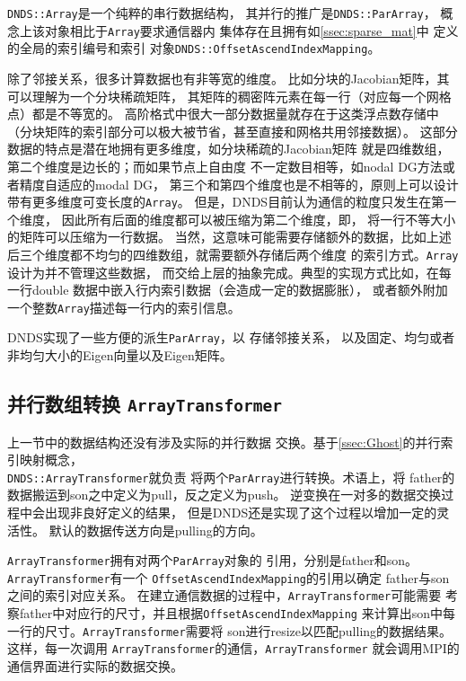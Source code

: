 \documentclass[UTF8,zihao=5]{ctexart} %
\begin{document}
\verb|DNDS::Array|是一个纯粹的串行数据结构，
其并行的推广是\verb|DNDS::ParArray|，
概念上该对象相比于\verb|Array|要求通信器内
集体存在且拥有如\ref{ssec:sparse_mat}中
定义的全局的索引编号和索引
对象\verb|DNDS::OffsetAscendIndexMapping|。


除了邻接关系，很多计算数据也有非等宽的维度。
比如分块的Jacobian矩阵，其可以理解为一个分块稀疏矩阵，
其矩阵的稠密阵元素在每一行（对应每一个网格点）都是不等宽的。
高阶格式中很大一部分数据量就存在于这类浮点数存储中
（分块矩阵的索引部分可以极大被节省，甚至直接和网格共用邻接数据）。
这部分数据的特点是潜在地拥有更多维度，如分块稀疏的Jacobian矩阵
就是四维数组，第二个维度是边长的；而如果节点上自由度
不一定数目相等，如nodal DG方法或者精度自适应的modal DG，
第三个和第四个维度也是不相等的，原则上可以设计
带有更多维度可变长度的\verb|Array|。
但是，DNDS目前认为通信的粒度只发生在第一个维度，
因此所有后面的维度都可以被压缩为第二个维度，即，
将一行不等大小的矩阵可以压缩为一行数据。
当然，这意味可能需要存储额外的数据，比如上述
后三个维度都不均匀的四维数组，就需要额外存储后两个维度
的索引方式。\verb|Array|设计为并不管理这些数据，
而交给上层的抽象完成。典型的实现方式比如，在每一行double
数据中嵌入行内索引数据（会造成一定的数据膨胀），
或者额外附加一个整数\verb|Array|描述每一行内的索引信息。

DNDS实现了一些方便的派生\verb|ParArray|，以
存储邻接关系，
以及固定、均匀或者非均匀大小的Eigen向量以及Eigen矩阵。

\subsection{并行数组转换 \texttt{ArrayTransformer}}

上一节中的数据结构还没有涉及实际的并行数据
交换。基于\ref{ssec:Ghost}的并行索引映射概念，\\
\verb|DNDS::ArrayTransformer|就负责
将两个\verb|ParArray|进行转换。术语上，将
father的数据搬运到son之中定义为pull，反之定义为push。
逆变换在一对多的数据交换过程中会出现非良好定义的结果，
但是DNDS还是实现了这个过程以增加一定的灵活性。
默认的数据传送方向是pulling的方向。

\verb|ArrayTransformer|拥有对两个\verb|ParArray|对象的
引用，分别是father和son。\verb|ArrayTransformer|有一个
\verb|OffsetAscendIndexMapping|的引用以确定
father与son之间的索引对应关系。
在建立通信数据的过程中，\verb|ArrayTransformer|可能需要
考察father中对应行的尺寸，并且根据\verb|OffsetAscendIndexMapping|
来计算出son中每一行的尺寸。\verb|ArrayTransformer|需要将
son进行resize以匹配pulling的数据结果。这样，每一次调用
\verb|ArrayTransformer|的通信，\verb|ArrayTransformer|
就会调用MPI的通信界面进行实际的数据交换。
\end{document}
